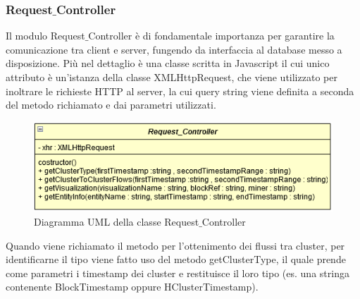 \begin{onehalfspacing}
\subsubsection{Request$\_$Controller}
Il modulo Request$\_$Controller è di fondamentale importanza per garantire la comunicazione tra client e server, fungendo da interfaccia al database messo a disposizione.
Più nel dettaglio è una classe scritta in Javascript il cui unico attributo è un'istanza della classe XMLHttpRequest, che viene utilizzato per inoltrare le richieste HTTP al server, la cui query string viene definita a seconda del metodo richiamato e dai parametri utilizzati.

\thispagestyle{mystyle}

\begin{figure}[H]
    \centering \includegraphics[keepaspectratio=true,scale=1]{Images/UMLRequestController.png}
    \caption{Diagramma UML della classe Request$\_$Controller}
\end{figure}

Quando viene richiamato il metodo per l'ottenimento dei flussi tra cluster, per identificarne il tipo viene fatto uso del metodo getClusterType, il quale prende come parametri i timestamp dei cluster e restituisce il loro tipo (es. una stringa contenente BlockTimestamp oppure HClusterTimestamp).
\end{onehalfspacing}

